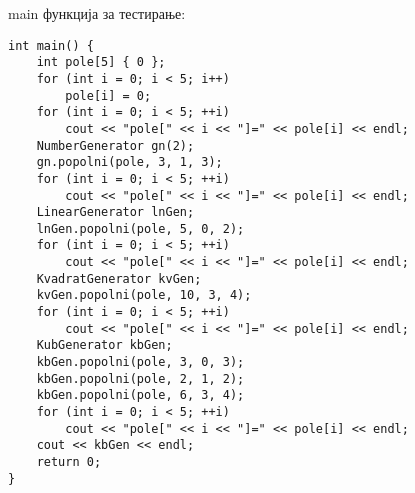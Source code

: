 \documentclass[12pt,a4paper]{exam}
\begin{document}
\begin{questions}
main функција за тестирање:
\begin{lstlisting}
int main() {
    int pole[5] { 0 };
    for (int i = 0; i < 5; i++)
        pole[i] = 0;
    for (int i = 0; i < 5; ++i)
        cout << "pole[" << i << "]=" << pole[i] << endl;
    NumberGenerator gn(2);
    gn.popolni(pole, 3, 1, 3);
    for (int i = 0; i < 5; ++i)
        cout << "pole[" << i << "]=" << pole[i] << endl;
    LinearGenerator lnGen;
    lnGen.popolni(pole, 5, 0, 2);
    for (int i = 0; i < 5; ++i)
        cout << "pole[" << i << "]=" << pole[i] << endl;
    KvadratGenerator kvGen;
    kvGen.popolni(pole, 10, 3, 4);
    for (int i = 0; i < 5; ++i)
        cout << "pole[" << i << "]=" << pole[i] << endl;
    KubGenerator kbGen;
    kbGen.popolni(pole, 3, 0, 3);
    kbGen.popolni(pole, 2, 1, 2);
    kbGen.popolni(pole, 6, 3, 4);
    for (int i = 0; i < 5; ++i)
        cout << "pole[" << i << "]=" << pole[i] << endl;
    cout << kbGen << endl;
    return 0;
}
\end{lstlisting}

\end{questions}
\end{document}

